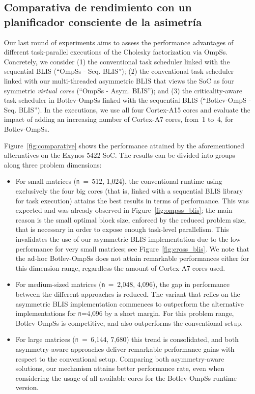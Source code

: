 \subsection{Comparativa de rendimiento con un planificador consciente de la asimetría}
\label{sec:comparative}

Our last round of experiments aims to assess the performance advantages of different task-parallel executions
of the Cholesky factorization via OmpSs. Concretely, we consider 
(1) the conventional task scheduler linked with the sequential BLIS (``OmpSs - Seq. BLIS''); 
(2) the conventional task scheduler linked with our multi-threaded asymmetric BLIS that views the SoC as four symmetric {\em virtual cores}
(``OmpSs - Asym. BLIS''); and 
(3) the criticality-aware task scheduler in Botlev-OmpSs linked with the sequential BLIS
(``Botlev-OmpS - Seq. BLIS''). 
In the executions, we use all four Cortex-A15 cores and 
evaluate the impact of adding an increasing number of Cortex-A7 cores, from~1 to~4, for Botlev-OmpSs. 

Figure~\ref{fig:comparative} shows the performance attained by the aforementioned alternatives on the Exynos 5422 SoC.
The results can be divided into groups along three problem dimensions:
\begin{itemize}
 \item For small matrices ({\tt n}~=~512, 1,024), the conventional runtime using exclusively the four big cores (that is,
linked with a sequential BLIS library for task execution) attains the best results in terms of performance. This was
expected and was already observed in Figure~\ref{fig:ompss_blis}; the main reason is the small optimal block size,
enforced by the reduced problem size, that is necessary in order to expose enough task-level parallelism. This invalidates the
use of our asymmetric BLIS implementation due to the low performance for very small matrices;
see Figure~\ref{fig:cross_blis}. We note that the ad-hoc Botlev-OmpSs does not attain
remarkable performances either for this dimension range, regardless the amount of Cortex-A7 cores used.

 \item For medium-sized matrices ({\tt n}~=~2,048, 4,096), the gap in performance between the different approaches is reduced. 
The variant that relies on the asymmetric BLIS implementation commences to outperform the alternative implementations for
{\tt n}=4,096 by a short margin. For this problem range, Botlev-OmpSs is competitive, and also outperforms the conventional setup.

 \item For large matrices ({\tt n}~=~6,144, 7,680) this trend is consolidated, and both asymmetry-aware approaches deliver
remarkable performance gains with respect to the conventional setup. Comparing both asymmetry-aware solutions, our
mechanism attains better performance rate, even when considering the usage of all available cores for the Botlev-OmpSs
runtime version.

\end{itemize}

